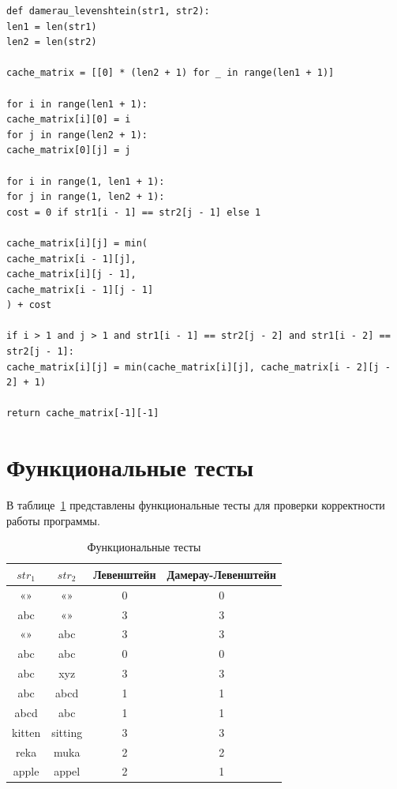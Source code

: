 \documentclass[a4paper, 14pt]{extreport}
\begin{document}
    \begin{lstlisting}[style=python, caption=Нерекурсивный алгоритм Дамерау-Левенштейна,label={lst:damlev}]
def damerau_levenshtein(str1, str2):
len1 = len(str1)
len2 = len(str2)

cache_matrix = [[0] * (len2 + 1) for _ in range(len1 + 1)]

for i in range(len1 + 1):
cache_matrix[i][0] = i
for j in range(len2 + 1):
cache_matrix[0][j] = j

for i in range(1, len1 + 1):
for j in range(1, len2 + 1):
cost = 0 if str1[i - 1] == str2[j - 1] else 1

cache_matrix[i][j] = min(
cache_matrix[i - 1][j],
cache_matrix[i][j - 1],
cache_matrix[i - 1][j - 1]
) + cost

if i > 1 and j > 1 and str1[i - 1] == str2[j - 2] and str1[i - 2] == str2[j - 1]:
cache_matrix[i][j] = min(cache_matrix[i][j], cache_matrix[i - 2][j - 2] + 1)

return cache_matrix[-1][-1]
    \end{lstlisting}

    \clearpage


    \section{Функциональные тесты}\label{sec:-}

    В таблице~\ref{tbl:func_test} представлены функциональные тесты для проверки корректности работы программы.

    \begin{table}[h]
        \begin{center}
            \caption{\label{tbl:func_test} Функциональные тесты}
            \begin{tabular}{|c|c|c|c|}
                \hline
                $str_{1}$ & $str_{2}$ & Левенштейн & Дамерау-Левенштейн
                \\ \hline
                «» & «» & 0 & 0
                \\ \hline
                abc & «» & 3 & 3
                \\ \hline
                «» & abc & 3 & 3
                \\ \hline
                abc & abc & 0 & 0
                \\ \hline
                abc & xyz & 3 & 3
                \\ \hline
                abc & abcd & 1 & 1
                \\ \hline
                abcd & abc & 1 & 1
                \\ \hline
                kitten & sitting & 3 & 3
                \\ \hline
                reka & muka & 2 & 2
                \\ \hline
                apple & appel & 2 & 1
                \\ \hline
            \end{tabular}
        \end{center}
    \end{table}
\end{document}
